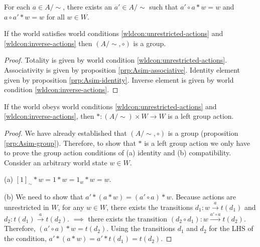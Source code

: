 \begin{world_condition}\label{wldcon:inverse-actions}
    For each $a \in A/\sim$, there exists an $a' \in A/\sim$ such that $a' \circ a * w = w$ and $a \circ a' * w = w$ for all $w \in W$.
\end{world_condition}


\begin{proposition}\label{prp:Asim-group}
    If the world satisfies world conditions \ref{wldcon:unrestricted-actions} and \ref{wldcon:inverse-actions} then $(A/\sim, \circ)$ is a group.
\end{proposition}
\begin{proof}
    Totality is given by world condition \ref{wldcon:unrestricted-actions}.
    Associativity is given by proposition \ref{prp:Asim-associative}.
    Identity element given by proposition \ref{prp:Asim-identity}.
    Inverse element is given by world condition \ref{wldcon:inverse-actions}.
\end{proof}

\begin{proposition}\label{prp:world-conditions-sufficient}
    If the world obeys world conditions \ref{wldcon:unrestricted-actions} and \ref{wldcon:inverse-actions}, then $*: (A/\sim) \times W \to W$ is a left group action.
\end{proposition}
\begin{proof}
    We have already established that $(A/\sim, \circ)$ is a group (proposition \ref{prp:Asim-group}).
    Therefore, to show that $*$ is a left group action we only have to prove the group action conditions of (a) identity and (b) compatibility.
    Consider an arbitrary world state $w \in W$.
    
    (a) $[1]_{\sim} * w = 1 * w = 1_{w} * w = w$.
    
    (b) We need to show that $a' * (a * w) = (a' \circ a) * w$.
    Because actions are unrestricted in $W$, for any $w \in W$, there exists the transitions $d_{1}: w \xrightarrow{a} t(d_{1})$ and $d_{2}: t(d_{1}) \xrightarrow{a} t(d_{2})$.
    $\implies$ there exists the transition $(d_{2} \circ d_{1}): w \xrightarrow{a' \circ a} t(d_{2})$.
    Therefore, $(a' \circ a) * w = t(d_{2})$.
    Using the transitions $d_{1}$ and $ d_{2}$ for the LHS of the condition, $a' * ( a * w) = a' * t(d_{1}) = t(d_{2})$.
\end{proof}

